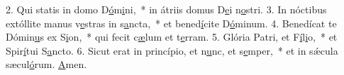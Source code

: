 2. Qui statis in domo D\uline{ó}m\uline{i}ni,~* in átriis domus D\uline{e}i n\uline{o}stri.
3. In nóctibus extóllite manus v\uline{e}stras in s\uline{a}ncta,~* et bened\uline{í}cite D\uline{ó}minum.
4. Benedícat te Dómin\uline{u}s ex S\uline{i}on,~* qui fecit c\uline{æ}lum et t\uline{e}rram.
5. Glória Patri, et F\uline{í}l\uline{i}o,~* et Spir\uline{í}tui S\uline{a}ncto.
6. Sicut erat in princípio, et n\uline{u}nc, et s\uline{e}mper,~* et in sǽcula sæcul\uline{ó}rum. \uline{A}men.
